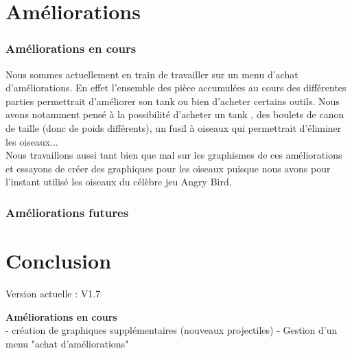 \documentclass[12pt,a4paper]{report}
\begin{document}
\part{Améliorations}
\section{Améliorations en cours}
Nous sommes actuellement en train de travailler sur un menu d'achat d'améliorations. En effet l'ensemble des pièce accumulées au cours des différentes parties permettrait d'améliorer son tank ou bien d'acheter certains outils. Nous avons notamment pensé à la possibilité d'acheter un tank , des boulets de canon de taille (donc de poids différents), un fusil à oiseaux qui permettrait d'éliminer les oiseaux...\\
Nous travaillons aussi tant bien que mal sur les graphismes de ces améliorations et essayons de créer des graphiques pour les oiseaux puisque nous avons pour l'instant utilisé les oiseaux du célèbre jeu Angry Bird.
\section{Améliorations futures}
\part{Conclusion}
Version actuelle : V1.7

\textbf{Améliorations en cours}\\
 - création de graphiques supplémentaires (nouveaux projectiles)
 - Gestion d'un menu "achat d'améliorations"
 \\
\end{document}
